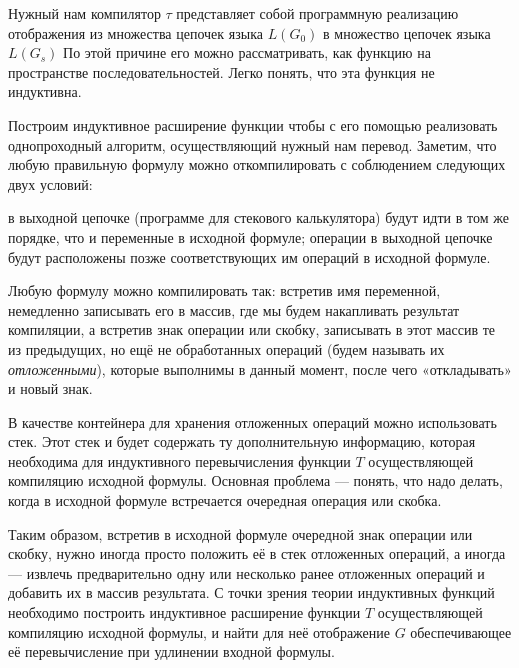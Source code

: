 Нужный нам компилятор $\tau$ представляет собой программную реализацию отображения из
множества цепочек языка $L(G_0)$ в множество цепочек языка $L(G_s)$ По этой причине его можно
рассматривать, как функцию на пространстве последовательностей. Легко понять,
что эта функция не индуктивна.

Построим индуктивное расширение  функции  чтобы с его помощью реализовать
однопроходный алгоритм, осуществляющий нужный нам перевод. Заметим, что любую
правильную формулу можно откомпилировать с соблюдением следующих двух условий:
\begin{itemize}
 в выходной цепочке (программе для стекового калькулятора) будут идти
в том же порядке, что и переменные в исходной формуле;
 операции в выходной цепочке будут расположены позже соответствующих им
операций в исходной формуле.
\end{itemize}

Любую формулу можно компилировать так: встретив имя переменной, немедленно
записывать его в массив, где мы будем накапливать результат компиляции, а
встретив знак операции или скобку, записывать в этот массив те из предыдущих,
но ещё не обработанных операций (будем называть их \emph{отложенными}), которые
выполнимы в данный момент, после чего «откладывать» и новый знак.

В качестве контейнера для хранения отложенных операций можно использовать стек.
Этот стек и будет содержать ту дополнительную информацию, которая необходима для
индуктивного перевычисления функции $T$ осуществляющей компиляцию исходной формулы.
Основная проблема — понять, что надо делать, когда в исходной формуле встречается
очередная операция или скобка.

Таким образом, встретив в исходной формуле очередной знак операции или скобку,
нужно иногда просто положить её в стек отложенных операций, а иногда — извлечь
предварительно одну или несколько ранее отложенных операций и добавить их в
массив результата. С точки зрения теории индуктивных функций необходимо построить
индуктивное расширение функции $T$ осуществляющей компиляцию исходной формулы, и
найти для неё отображение $G$ обеспечивающее её перевычисление при удлинении входной формулы.

